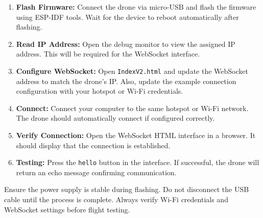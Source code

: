 \begin{manualblock}
\begin{enumerate}
  \item \textbf{Flash Firmware:} Connect the drone via micro-USB and flash the firmware using ESP-IDF tools. Wait for the device to reboot automatically after flashing.
  
  \item \textbf{Read IP Address:} Open the debug monitor to view the assigned IP address. This will be required for the WebSocket interface.
  
  \item \textbf{Configure WebSocket:}  
  Open \texttt{IndexV2.html} and update the WebSocket address to match the drone’s IP.  
  Also, update the example connection configuration with your hotspot or Wi-Fi credentials.
  
  \item \textbf{Connect:} Connect your computer to the same hotspot or Wi-Fi network. The drone should automatically connect if configured correctly.
  
  \item \textbf{Verify Connection:}  
  Open the WebSocket HTML interface in a browser. It should display that the connection is established.
  
  \item \textbf{Testing:} Press the \texttt{hello} button in the interface. If successful, the drone will return an echo message confirming communication.
\end{enumerate}

Ensure the power supply is stable during flashing. Do not disconnect the USB cable until the process is complete. Always verify Wi-Fi credentials and WebSocket settings before flight testing.

\end{manualblock}